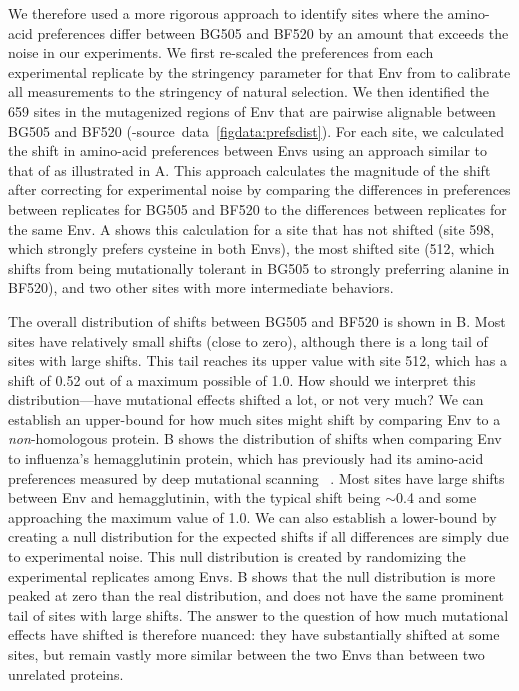 \documentclass[9pt]{elife}
\begin{document}
We therefore used a more rigorous approach to identify sites where the amino-acid preferences differ between BG505 and BF520 by an amount that exceeds the noise in our experiments.
We first re-scaled the preferences from each experimental replicate by the stringency parameter for that Env from  to calibrate all measurements to the stringency of natural selection.
We then identified the 659 sites in the mutagenized regions of Env that are pairwise alignable between BG505 and BF520 (-source~data~\ref{figdata:prefsdist}).
For each site, we calculated the shift in amino-acid preferences between Envs using an approach similar to that of \citet{doud2015site} as illustrated in A.
This approach calculates the magnitude of the shift after correcting for experimental noise by comparing the differences in preferences between replicates for BG505 and BF520 to the differences between replicates for the same Env.
A shows this calculation for a site that has not shifted (site 598, which strongly prefers cysteine in both Envs), the most shifted site (512, which shifts from being mutationally tolerant in BG505 to strongly preferring alanine in BF520), and two other sites with more intermediate behaviors.

The overall distribution of shifts between BG505 and BF520 is shown in B.
Most sites have relatively small shifts (close to zero), although there is a long tail of sites with large shifts.
This tail reaches its upper value with site 512, which has a shift of 0.52 out of a maximum possible of 1.0.
How should we interpret this distribution---have mutational effects shifted a lot, or not very much?
We can establish an upper-bound for how much sites might shift by comparing Env to a \emph{non}-homologous protein.
B shows the distribution of shifts when comparing Env to influenza's hemagglutinin protein, which has previously had its amino-acid preferences measured by deep mutational scanning~\citep{doud2016accurate} .
Most sites have large shifts between Env and hemagglutinin, with the typical shift being $\sim$0.4 and some approaching the maximum value of 1.0.
We can also establish a lower-bound by creating a null distribution for the expected shifts if all differences are simply due to experimental noise.
This null distribution is created by randomizing the experimental replicates among Envs.
B shows that the null distribution is more peaked at zero than the real distribution, and does not have the same prominent tail of sites with large shifts.
The answer to the question of how much mutational effects have shifted is therefore nuanced: they have substantially shifted at some sites, but remain vastly more similar between the two Envs than between two unrelated proteins. 
\end{document}

